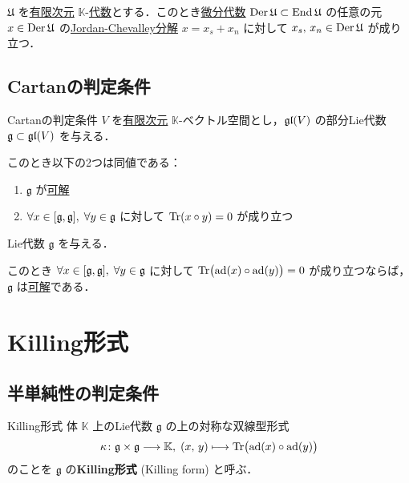 \documentclass[rep_main]{subfiles}
\begin{document}
\begin{mylem}[label=lem:JC-2]{}
	$\mathfrak{U}$ を\underline{有限次元} $\mathbb{K}$-\hyperref[ax:Alg]{代数}とする．このとき\hyperref[prop:Der-LieAlg]{微分代数} $\operatorname{Der} \mathfrak{U} \subset \operatorname{End} \mathfrak{U}$ の任意の元 $x \in \operatorname{Der} \mathfrak{U}$ の\hyperref[prop:Jordan-Chevalley]{Jordan-Chevalley分解} $x = x_s + x_n$ に対して $x_s,\, x_n \in \operatorname{Der} \mathfrak{U}$ が成り立つ．
\end{mylem}

\subsection{Cartanの判定条件}

\begin{mytheo}[label=thm:Cartan-crit]{Cartanの判定条件}
	$V$ を\underline{有限次元} $\mathbb{K}$-ベクトル空間とし，$\mathfrak{gl} (V)$ の部分Lie代数 $\mathfrak{g} \subset \mathfrak{gl} (V)$ を与える．

	このとき以下の2つは同値である：
	\begin{enumerate}
		\item $\mathfrak{g}$ が\hyperref[def:solvable-LieAlg]{可解}
		\item $\forall x \in \comm{\mathfrak{g}}{\mathfrak{g}},\; \forall y \in \mathfrak{g}$ に対して $\Tr (x \circ y) = 0$ が成り立つ
	\end{enumerate}
	
\end{mytheo}

\begin{mycol}[label=col:Cartan-crit]{}
	Lie代数 $\mathfrak{g}$ を与える．
	
	このとき $\forall x \in \comm{\mathfrak{g}}{\mathfrak{g}},\; \forall y \in \mathfrak{g}$ に対して $\Tr \bigl(\operatorname{ad} (x) \circ \operatorname{ad} (y)\bigr) = 0$ が成り立つならば，$\mathfrak{g}$ は\hyperref[def:solvable-LieAlg]{可解}である．
\end{mycol}


\section{Killing形式}

\subsection{半単純性の判定条件}


\begin{mydef}[label=def:Killing-form]{Killing形式}
	体 $\mathbb{K}$ 上のLie代数 $\mathfrak{g}$ の上の対称な双線型形式
	\begin{align}
		\kappa \colon \mathfrak{g} \times \mathfrak{g} \longrightarrow \mathbb{K},\; (x,\, y) \longmapsto \Tr \bigl( \operatorname{ad}(x) \circ \operatorname{ad}(y) \bigr) 
	\end{align}
	のことを $\mathfrak{g}$ の\textbf{Killing形式} (Killing form) と呼ぶ．
\end{mydef}
\end{document}
